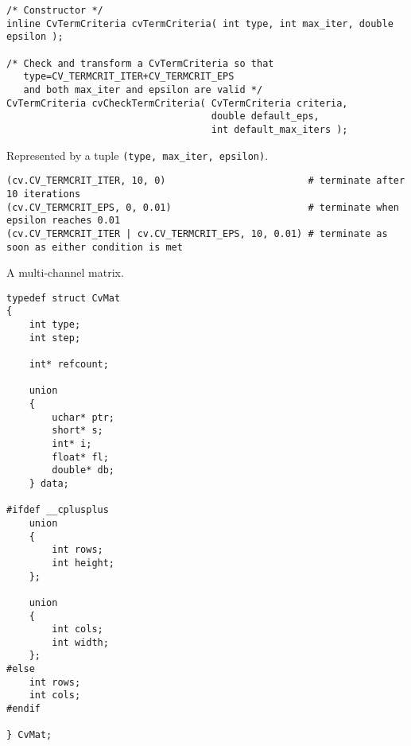 \begin{description}
\end{description}

\begin{lstlisting}
/* Constructor */
inline CvTermCriteria cvTermCriteria( int type, int max_iter, double epsilon );

/* Check and transform a CvTermCriteria so that 
   type=CV_TERMCRIT_ITER+CV_TERMCRIT_EPS
   and both max_iter and epsilon are valid */
CvTermCriteria cvCheckTermCriteria( CvTermCriteria criteria,
                                    double default_eps,
                                    int default_max_iters );
\end{lstlisting}
\else %
Represented by a tuple \texttt{(type, max\_iter, epsilon)}.

\begin{description}
\end{description}

\begin{lstlisting}
(cv.CV_TERMCRIT_ITER, 10, 0)                         # terminate after 10 iterations
(cv.CV_TERMCRIT_EPS, 0, 0.01)                        # terminate when epsilon reaches 0.01
(cv.CV_TERMCRIT_ITER | cv.CV_TERMCRIT_EPS, 10, 0.01) # terminate as soon as either condition is met
\end{lstlisting}
\fi %

\label{CvMat}

\ifC %
A multi-channel matrix.

\begin{lstlisting}
typedef struct CvMat
{
    int type; 
    int step; 

    int* refcount; 

    union
    {
        uchar* ptr;
        short* s;
        int* i;
        float* fl;
        double* db;
    } data; 

#ifdef __cplusplus
    union
    {
        int rows;
        int height;
    };

    union
    {
        int cols;
        int width;
    };
#else
    int rows; 
    int cols; 
#endif

} CvMat;
\end{lstlisting}

